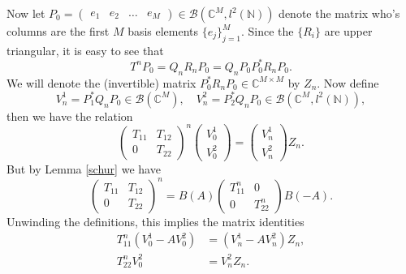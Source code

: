 \documentclass[a4paper,10pt]{article}
\begin{document}
Now let $P_0=\left(
\begin{matrix}
 e_1 & e_2 & \hdots & e_M
\end{matrix}
\right)\in\mathcal{B}(\mathbb{C}^M,l^2(\mathbb{N}))$ denote the matrix who's columns are the first $M$ basis elements $\{e_j\}_{j=1}^M$. Since the $\{R_i\}$ are upper triangular, it is easy to see that
$$
T^nP_0=Q_nR_nP_0=Q_nP_0P_0^*R_nP_0.
$$
We will denote the (invertible) matrix $P_0^*R_nP_0\in\mathbb{C}^{M\times M}$ by $Z_n$. Now define
$$
V^1_n=P_1^*Q_nP_0\in\mathcal{B}(\mathbb{C}^M), \quad V^2_n=P_2^*Q_nP_0\in\mathcal{B}(\mathbb{C}^M,l^2(\mathbb{N})),
$$
then we have the relation
$$
\left(\begin{matrix}
T_{11}      & T_{12} \\
0  & T_{22}
\end{matrix}\right)^n\left(\begin{matrix}
V^1_0       \\
V^2_0  
\end{matrix}\right)=\left(\begin{matrix}
V^1_n       \\
V^2_n  
\end{matrix}\right)Z_n.
$$
But by Lemma \ref{schur} we have
$$
\left(\begin{matrix}
T_{11}      & T_{12} \\
0  & T_{22}
\end{matrix}\right)^n=B(A)\left(\begin{matrix}
T_{11}^n      & 0 \\
0  & T_{22}^n
\end{matrix}\right)B(-A).
$$
Unwinding the definitions, this implies the matrix identities
\begin{align}
T_{11}^n(V_0^1-AV_0^2)&=(V_n^1-AV_n^2)Z_n,\label{mat1}\\
T_{22}^nV_0^2&=V_n^2Z_n\label{mat2}.
\end{align}
\end{document}
